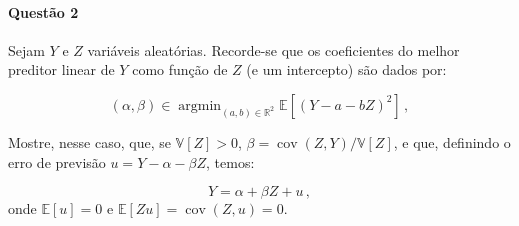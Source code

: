 \documentclass[10pt,a4paper]{article}
\begin{document}
\paragraph{Questão 2} Sejam $Y$ e $Z$ variáveis aleatórias. Recorde-se que os coeficientes do melhor preditor linear de $Y$ como função de $Z$ (e um intercepto) são  dados por:

$$(\alpha,\beta) \in \operatorname{argmin}_{(a,b) \in \mathbb{R}^2}\mathbb{E}[(Y-a-bZ)^2]\,,$$

Mostre, nesse caso, que, se $\mathbb{V}[Z] > 0$, $\beta =\operatorname{cov}(Z,Y)/\mathbb{V}[Z]$, e que, definindo o erro de previsão $u = Y - \alpha - \beta Z$, temos:

$$Y = \alpha + \beta Z + u \, ,$$
onde $\mathbb{E}[u] = 0$ e $\mathbb{E}[Zu] = \operatorname{cov}(Z,u) = 0$.

	
\end{document}
